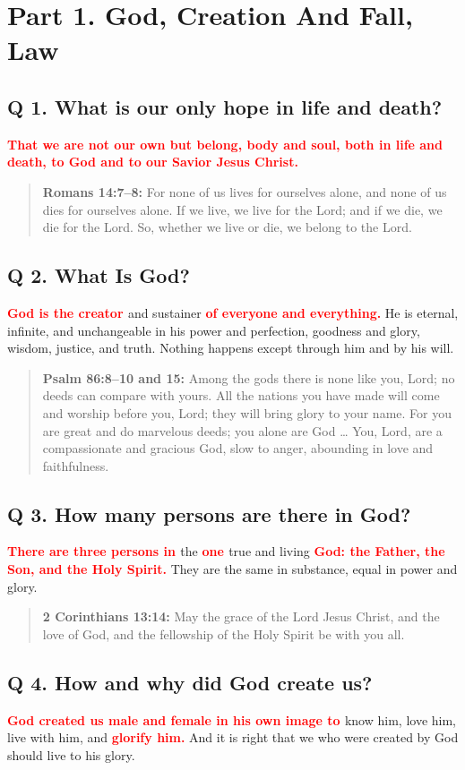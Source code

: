 \documentclass[]{memoir}
\newcommand\Children[1]{\textbf{\textcolor{red}{#1}}}
\newcommand\Quote[2]{\begin{quote}{\textbf{#1:}{ #2}}\end{quote}}
\begin{document}
\section[Part 1. God, Creation And Fall, Law][God, Creation And Fall, Law]{Part 1. God, Creation And Fall, Law}

\subsection{Q  1. What is our only hope in life and death?}
\Children{That we are not our own but belong, body and soul, both in life and death, to God and to our Savior Jesus Christ.}

\Quote{Romans 14:7--8}{For none of us lives for ourselves alone, and none of us dies for ourselves alone. If we live, we live for the Lord; and if we die, we die for the Lord. So, whether we live or die, we belong to the Lord.}


\subsection{Q  2. What Is God?}
\Children{God is the creator }and sustainer \Children{of everyone and everything.} He is eternal, infinite, and unchangeable in his power and perfection, goodness and glory, wisdom, justice, and truth. Nothing happens except through him and by his will.

\Quote{Psalm 86:8--10 and 15\index[psa]{86:15}}{Among the gods there is none like you, Lord; no deeds can compare with yours. All the nations you have made will come and worship before you, Lord; they will bring glory to your name. For you are great and do marvelous deeds; you alone are God {\dots} You, Lord, are a compassionate and gracious God, slow to anger, abounding in love and faithfulness.}


\subsection{Q  3. How many persons are there in God?}
\Children{There are three persons in }the \Children{one }true and living \Children{God: the Father, the Son, and the Holy Spirit.} They are the same in substance, equal in power and glory.

\Quote{2 Corinthians 13:14}{May the grace of the Lord Jesus Christ, and the love of God, and the fellowship of the Holy Spirit be with you all.}


\subsection{Q  4. How and why did God create us?}
\Children{God created us male and female in his own image to }know him, love him, live with him, and \Children{glorify him.} And it is right that we who were created by God should live to his glory.
\end{document}
